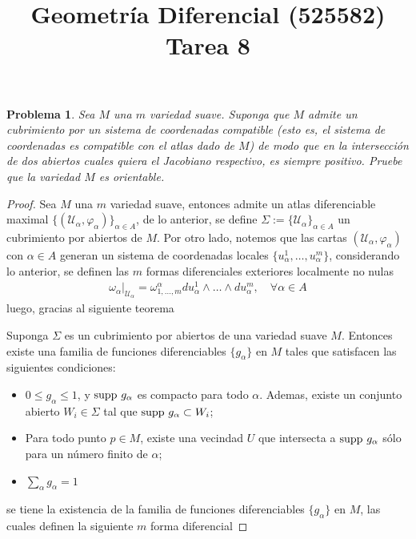 \documentclass[10pt,a4paper]{report}
\title{\color{azul}\textbf{Geometría Diferencial (525582)}\\
	\textbf{Tarea 8}}
\author{\color{azul}\autor}
\date{\color{azul}\fecha}
\newtheorem{pro}{Problema}
\begin{document}
	\begin{pro}\upshape
		Sea $M$ una $m$ variedad suave. Suponga que $M$ admite un cubrimiento por un sistema de coordenadas compatible (esto es, el sistema de coordenadas es compatible con el atlas dado de $M$) de modo que en la intersección de dos abiertos cuales quiera el Jacobiano respectivo, es siempre positivo. Pruebe que la variedad $M$ es orientable.
	\end{pro}
	\begin{proof}
	    Sea $M$ una $m$ variedad suave, entonces admite un atlas diferenciable maximal $\{\left(\mathcal{U}_{\alpha},\varphi_{\alpha} \right) \}_{\alpha\in A}$, de lo anterior, se define $\Sigma := \{\mathcal{U}_{\alpha}\}_{\alpha\in A}$ un cubrimiento por abiertos de $M$. Por otro lado, notemos que las cartas $\left( \mathcal{U}_{\alpha},\varphi_{\alpha}\right) $ con $\alpha\in A$ generan un sistema de coordenadas locales $\{u^{1}_{\alpha},\dots,u^{m}_{\alpha}\}$, considerando lo anterior, se definen las $m$ formas diferenciales exteriores localmente no nulas
	    \begin{align*}
	    	\omega_{\alpha}\big|_{\mathcal{U}_{\alpha}} = \omega_{1,\dots,m}^{\alpha}du^{1}_{\alpha}\wedge \dots\wedge du^{m}_{\alpha},\quad \forall \alpha\in A
	    \end{align*}
       luego, gracias al siguiente teorema
       \begin{tcolorbox}[title= \textbf{Teorema Partición de la Unidad},colback=blue!4,colframe=blue!30!black!80,colbacktitle=blue!30!black!80]
       	Suponga $\Sigma$ es un cubrimiento por abiertos de una variedad suave $M$. Entonces existe una familia de funciones diferenciables $\{g_{\alpha}\}$ en $M$ tales que satisfacen las siguientes condiciones:
       	\begin{itemize}
       		\item[$1)$] $0 \leq g_{\alpha} \leq 1$, y $\textup{supp}\ g_{\alpha}$ es compacto para todo $\alpha$. Ademas, existe un conjunto abierto $W_{i}\in \Sigma$ tal que $\textup{supp}\ g_{\alpha} \subset W_{i}$;
       		\item[$2)$] Para todo punto $p\in M$, existe una vecindad $U$ que intersecta a
       		$\textup{supp}\ g_{\alpha}$ sólo para un número finito de $\alpha$;
       		\item[$3)$] $\displaystyle\sum_{\alpha}g_{\alpha} = 1$
       	\end{itemize}
       \end{tcolorbox}
       se tiene la existencia de la familia de funciones diferenciables $\{g_{\alpha}\}$ en $M$, las cuales definen la siguiente $m$ forma diferencial 

\end{proof}
\end{document}
